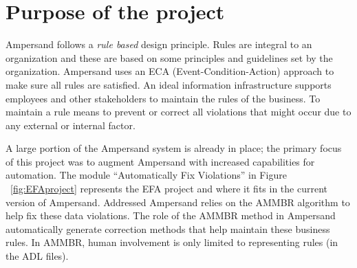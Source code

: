 %

\section{Purpose of the project}

Ampersand follows a \emph{rule based} design principle. Rules are integral to an organization
and these are based on some principles and guidelines set by the organization.
Ampersand uses an ECA (Event-Condition-Action) approach to make sure all rules are satisfied. An ideal information infrastructure supports employees and other stakeholders to maintain the rules of the business. To maintain a rule means to prevent or correct all violations that might occur due to any external or internal factor.
 
 A large portion of the Ampersand system is already in place; the primary focus of this project was to
augment Ampersand with increased capabilities for automation. The module ``Automatically Fix Violations'' in Figure ~\ref{fig:EFAproject} represents the EFA project and where it fits in the current version of Ampersand.
  {Addressed}
Ampersand relies on the AMMBR \citep{Ampersand} algorithm to help fix these data violations.
The role 
of the AMMBR method in Ampersand  automatically generate correction methods that 
help maintain these business rules. In AMMBR, human involvement is only limited 
to representing rules (in the ADL files).

